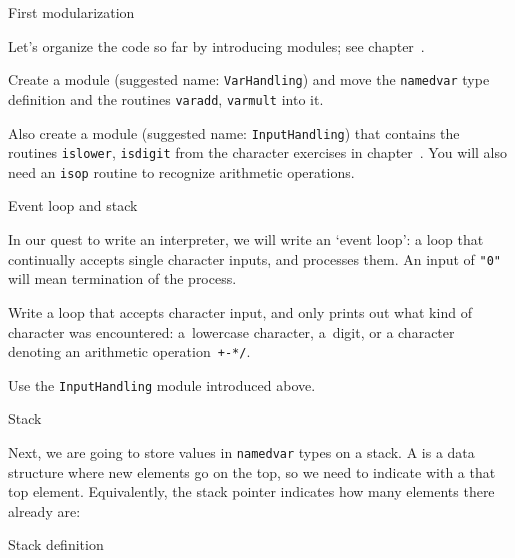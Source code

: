  {First modularization}

Let's organize the code so far by introducing modules;
see chapter~.

\begin{exercise}
  \label{ex:f-named-var-mod}
  Create a module (suggested name: \lstinline{VarHandling}) and
  move the \lstinline{namedvar} type definition and
  the routines \lstinline{varadd}, \lstinline{varmult}
  into it.
\end{exercise}

\begin{exercise}
  \label{ex:f-char-mod}
  Also create a module (suggested name: \lstinline{InputHandling})
  that contains
  the routines \lstinline{islower}, \lstinline{isdigit}
  from the character exercises in chapter~.
  You will also need an \lstinline{isop} routine to recognize
  arithmetic operations.
\end{exercise}

 {Event loop and stack}

In our quest to write an interpreter, we will write an
`event loop': a loop that continually accepts single character inputs,
and processes them.
An input of \lstinline{"0"} will mean termination of the process.

\begin{exercise}
  \label{ex:f-var-event-loop}
  Write a loop that accepts character input,
  and only prints out what kind of character was encountered:
  a~lowercase character, a~digit, or a character denoting
  an arithmetic operation~\lstinline|+-*/|.


  Use the \lstinline{InputHandling} module introduced above.
\end{exercise}

 {Stack}

Next, we are going to  store values in \lstinline{namedvar} types on a stack.
A  is a data structure where new elements go on the top,
so we need to indicate with a 
that top element.
Equivalently, the stack pointer indicates how many elements there already are:

\begin{block}{Stack definition}
  \label{sl:f-var-stack-def}
\end{block}


